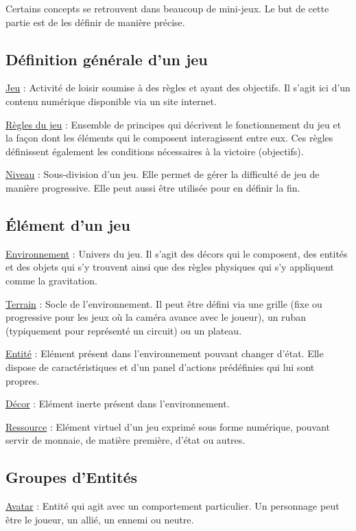 Certains concepts se retrouvent dans beaucoup de mini-jeux. Le but de cette partie est de les définir de manière précise.

\subsection*{Définition générale d'un jeu}

\underline{Jeu} : 
Activité de loisir soumise à des règles et ayant des objectifs. Il s'agit ici d'un contenu numérique
 disponible via un site internet.

\underline{Règles du jeu} : 
Ensemble de principes qui décrivent le fonctionnement du jeu et 
la façon dont les éléments qui le composent interagissent entre eux. 
Ces règles définissent également les conditions nécessaires à la victoire (objectifs).

\underline{Niveau} :
Sous-division d'un jeu. Elle permet de gérer la difficulté de jeu de manière progressive. Elle peut aussi être utilisée pour en définir la fin. 

\subsection*{Élément d'un jeu}

\underline{Environnement} : 
Univers du jeu. Il s'agit des décors qui le composent, des entités et des objets qui s'y trouvent ainsi que 
des règles physiques qui s'y appliquent comme la gravitation.

\underline{Terrain} : 
Socle de l'environnement. Il peut être défini via une grille (fixe ou progressive pour les jeux où la caméra avance avec le joueur), un ruban
(typiquement pour représenté un circuit) ou un plateau. 

\underline{Entité} : 
Elément présent dans l'environnement pouvant changer d'état. 
Elle dispose de caractéristiques et d'un panel d'actions prédéfinies qui lui sont propres.

\underline{Décor} : 
Elément inerte présent dans l'environnement.

\underline{Ressource} : 
Elément virtuel d'un jeu exprimé sous forme numérique, pouvant servir de monnaie, de matière première, d'état ou autres.

\subsection*{Groupes d'Entités}

\underline{Avatar} :
Entité qui agit avec un comportement particulier. Un personnage peut être le joueur, un allié, un ennemi ou neutre.

